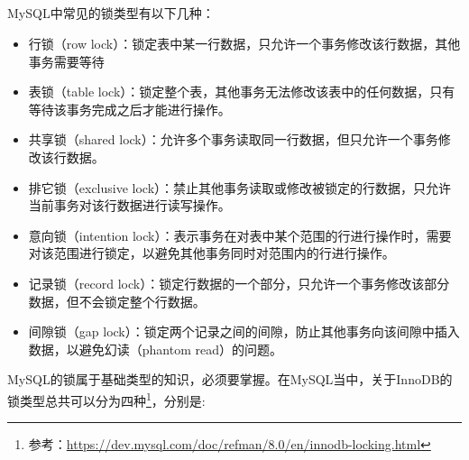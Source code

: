\documentclass[../../../interview-questions.tex]{subfiles}
\begin{document}
\subsection{\color{red}{MySQL的锁类型}}

MySQL中常见的锁类型有以下几种：

\begin{itemize}
    \item {行锁（row lock）：锁定表中某一行数据，只允许一个事务修改该行数据，其他事务需要等待}
    \item {表锁（table lock）：锁定整个表，其他事务无法修改该表中的任何数据，只有等待该事务完成之后才能进行操作。}
    \item {共享锁（shared lock）：允许多个事务读取同一行数据，但只允许一个事务修改该行数据。}
    \item {排它锁（exclusive lock）：禁止其他事务读取或修改被锁定的行数据，只允许当前事务对该行数据进行读写操作。}
    \item {意向锁（intention lock）：表示事务在对表中某个范围的行进行操作时，需要对该范围进行锁定，以避免其他事务同时对范围内的行进行操作。}
    \item {记录锁（record lock）：锁定行数据的一个部分，只允许一个事务修改该部分数据，但不会锁定整个行数据。}
    \item {间隙锁（gap lock）：锁定两个记录之间的间隙，防止其他事务向该间隙中插入数据，以避免幻读（phantom read）的问题。}
\end{itemize}

MySQL的锁属于基础类型的知识，必须要掌握。在MySQL当中，关于InnoDB的锁类型总共可以分为四种\footnote{参考：\url{https://dev.mysql.com/doc/refman/8.0/en/innodb-locking.html}}，分别是:
\end{document}
